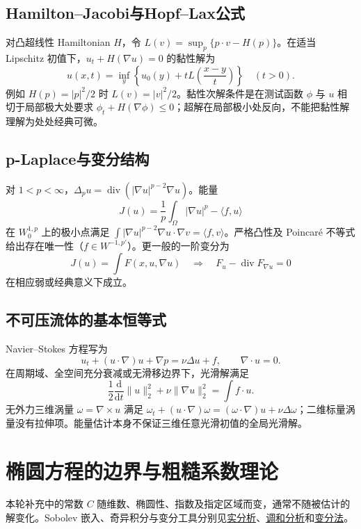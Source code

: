 \documentclass[../main.tex]{subfiles}
\begin{document}
\subsection{Hamilton--Jacobi与Hopf--Lax公式}
对凸超线性 Hamiltonian $H$，令 $L(v)=\sup_p\{p\cdot v-H(p)\}$。在适当 Lipschitz 初值下，$u_t+H(\nabla u)=0$ 的黏性解为
\[
u(x,t)=\inf_y\left\{u_0(y)+tL\left(\frac{x-y}t\right)\right\}\quad(t>0).
\]
例如 $H(p)=|p|^2/2$ 时 $L(v)=|v|^2/2$。黏性次解条件是在测试函数 $\phi$ 与 $u$ 相切于局部极大处要求 $\phi_t+H(\nabla\phi)\le0$；超解在局部极小处反向，不能把黏性解理解为处处经典可微。
\subsection{p-Laplace与变分结构}
对 $1<p<\infty$，$\Delta_pu=\operatorname{div}(|\nabla u|^{p-2}\nabla u)$。能量
\[
J(u)=\frac1p\int_\Omega|\nabla u|^p-\langle f,u\rangle
\]
在 $W_0^{1,p}$ 上的极小点满足 $\int|\nabla u|^{p-2}\nabla u\cdot\nabla v=\langle f,v\rangle$。严格凸性及 Poincaré 不等式给出存在唯一性（$f\in W^{-1,p'}$）。更一般的一阶变分为
\[
J(u)=\int F(x,u,\nabla u)\quad\Longrightarrow\quad
F_u-\operatorname{div}F_{\nabla u}=0
\]
在相应弱或经典意义下成立。
\subsection{不可压流体的基本恒等式}
Navier--Stokes 方程写为
\[
u_t+(u\cdot\nabla)u+\nabla p=\nu\Delta u+f,\qquad\nabla\cdot u=0.
\]
在周期域、全空间充分衰减或无滑移边界下，光滑解满足
\[
\frac12\frac{\mathrm d}{\mathrm dt}\|u\|_2^2+\nu\|\nabla u\|_2^2=\int f\cdot u.
\]
无外力三维涡量 $\omega=\nabla\times u$ 满足 $\omega_t+(u\cdot\nabla)\omega=(\omega\cdot\nabla)u+\nu\Delta\omega$；二维标量涡量没有拉伸项。能量估计本身不保证三维任意光滑初值的全局光滑解。

\section{椭圆方程的边界与粗糙系数理论}
本轮补充中的常数 $C$ 随维数、椭圆性、指数及指定区域而变，通常不随被估计的解变化。Sobolev 嵌入、奇异积分与变分工具分别见\hyperref[chap:real-analysis]{实分析}、\hyperref[chap:harmonic-analysis]{调和分析}和\hyperref[chap:calculus-of-variations]{变分法}。
\end{document}
